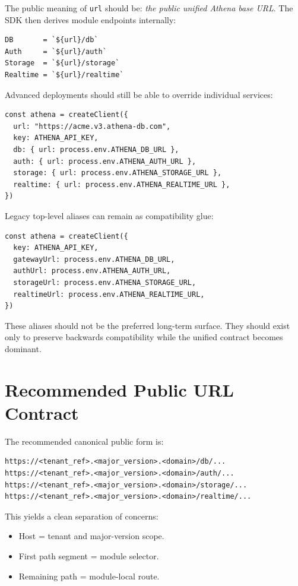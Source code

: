 \documentclass[11pt]{article}
\begin{document}
The public meaning of \texttt{url} should be: \emph{the public unified Athena base URL}. The SDK then derives module endpoints internally:

\begin{lstlisting}[language=TypeScriptAthena]
DB       = `${url}/db`
Auth     = `${url}/auth`
Storage  = `${url}/storage`
Realtime = `${url}/realtime`
\end{lstlisting}

Advanced deployments should still be able to override individual services:

\begin{lstlisting}[language=TypeScriptAthena]
const athena = createClient({
  url: "https://acme.v3.athena-db.com",
  key: ATHENA_API_KEY,
  db: { url: process.env.ATHENA_DB_URL },
  auth: { url: process.env.ATHENA_AUTH_URL },
  storage: { url: process.env.ATHENA_STORAGE_URL },
  realtime: { url: process.env.ATHENA_REALTIME_URL },
})
\end{lstlisting}

Legacy top-level aliases can remain as compatibility glue:

\begin{lstlisting}[language=TypeScriptAthena]
const athena = createClient({
  key: ATHENA_API_KEY,
  gatewayUrl: process.env.ATHENA_DB_URL,
  authUrl: process.env.ATHENA_AUTH_URL,
  storageUrl: process.env.ATHENA_STORAGE_URL,
  realtimeUrl: process.env.ATHENA_REALTIME_URL,
})
\end{lstlisting}

These aliases should not be the preferred long-term surface. They should exist only to preserve backwards compatibility while the unified contract becomes dominant.

\section{Recommended Public URL Contract}

The recommended canonical public form is:

\begin{lstlisting}
https://<tenant_ref>.<major_version>.<domain>/db/...
https://<tenant_ref>.<major_version>.<domain>/auth/...
https://<tenant_ref>.<major_version>.<domain>/storage/...
https://<tenant_ref>.<major_version>.<domain>/realtime/...
\end{lstlisting}

This yields a clean separation of concerns:

\begin{itemize}[leftmargin=1.5em]
  \item Host = tenant and major-version scope.
  \item First path segment = module selector.
  \item Remaining path = module-local route.
\end{itemize}
\end{document}
